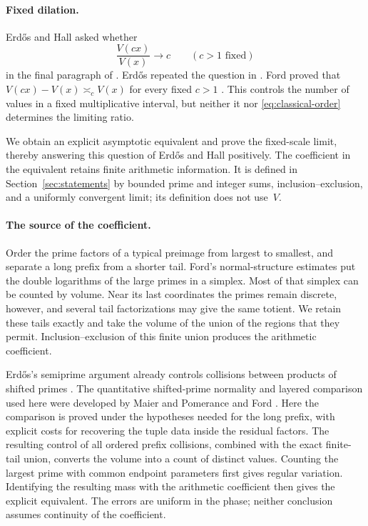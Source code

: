 \paragraph{Fixed dilation.}
Erd\H{o}s and Hall asked whether
\[
 \frac{V(cx)}{V(x)}\longrightarrow c
 \qquad(c>1\text{ fixed})
\]
in the final paragraph of \cite[p.~3]{ErdosHall1976}.
Erd\H{o}s repeated the question in \cite[p.~80]{Erdos1979}.
Ford proved that $V(cx)-V(x)\asymp_c V(x)$ for every fixed $c>1$
\cite[Theorem~4]{FordTotients2013}. This controls the number of
values in a fixed multiplicative interval, but neither it nor
\eqref{eq:classical-order} determines the limiting ratio.

We obtain an explicit asymptotic equivalent and prove the fixed-scale limit, thereby answering this question of Erd\H{o}s and Hall positively. The coefficient in the equivalent retains finite arithmetic information. It is defined in Section~\ref{sec:statements} by bounded prime and integer sums, inclusion--exclusion, and a uniformly convergent limit; its definition does not use~$V$.

\paragraph{The source of the coefficient.}
Order the prime factors of a typical preimage from largest to smallest, and separate a long prefix from a shorter tail. Ford's normal-structure estimates put the double logarithms of the large primes in a simplex. Most of that simplex can be counted by volume. Near its last coordinates the primes remain discrete, however, and several tail factorizations may give the same totient. We retain these tails exactly and take the volume of the union of the regions that they permit. Inclusion--exclusion of this finite union produces the arithmetic coefficient.

Erd\H{o}s's semiprime argument already controls collisions between
products of shifted primes \cite[Lemma~1]{Erdos1945}. The quantitative
shifted-prime normality and layered comparison used here were developed
by Maier and Pomerance \cite[Sections~2--3]{MaierPomerance1988}
and Ford \cite[Section~5]{FordTotients2013}. Here the comparison is
proved under the hypotheses needed for the long prefix, with explicit
costs for recovering the tuple data inside the residual factors.
The resulting control of all ordered prefix collisions, combined with
the exact finite-tail union, converts the volume into a count of
distinct values. Counting the largest prime with common endpoint
parameters first gives regular variation. Identifying the resulting
mass with the arithmetic coefficient then gives the explicit equivalent.
The errors are uniform in the phase; neither conclusion assumes
continuity of the coefficient.


